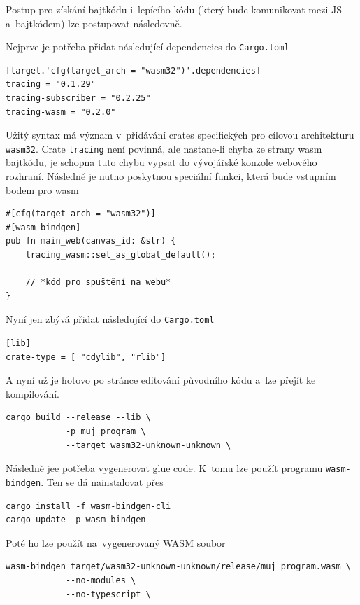 \documentclass[a4paper, 12pt]{article} %
\begin{document}
        Postup pro získání bajtkódu i~lepícího kódu (který bude komunikovat mezi JS a~bajtkódem) lze postupovat následovně.
        
        Nejprve je potřeba přidat následující dependencies do \texttt{Cargo.toml}
        \begin{verbatim}
[target.'cfg(target_arch = "wasm32")'.dependencies]
tracing = "0.1.29"
tracing-subscriber = "0.2.25"
tracing-wasm = "0.2.0"
        \end{verbatim}
        
        Užitý syntax má význam v~přidávání crates specifických pro cílovou architekturu \texttt{wasm32}. Crate \texttt{tracing} není povinná, ale nastane-li chyba ze strany wasm bajtkódu, je schopna tuto chybu vypsat do vývojářské konzole webového rozhraní. Následně je nutno poskytnou speciální funkci, která bude vstupním bodem pro wasm
        \begin{verbatim}
#[cfg(target_arch = "wasm32")]
#[wasm_bindgen]
pub fn main_web(canvas_id: &str) {
    tracing_wasm::set_as_global_default();

    // *kód pro spuštění na webu*
}
        \end{verbatim}
        
        Nyní jen zbývá přidat následující do \texttt{Cargo.toml}
\begin{verbatim}
[lib]
crate-type = [ "cdylib", "rlib"]
        \end{verbatim}
        
        A nyní už je hotovo po stránce editování původního kódu a~lze přejít ke kompilování.
        \begin{verbatim}
cargo build --release --lib \
            -p muj_program \
            --target wasm32-unknown-unknown \
        \end{verbatim}
        
        Následně jee potřeba vygenerovat glue code. K~tomu lze použít programu \texttt{wasm-bindgen}. Ten se dá nainstalovat přes
        \begin{verbatim}
cargo install -f wasm-bindgen-cli
cargo update -p wasm-bindgen
        \end{verbatim}
        
        Poté ho lze použít na~vygenerovaný WASM soubor
        \begin{verbatim}
wasm-bindgen target/wasm32-unknown-unknown/release/muj_program.wasm \
            --no-modules \
            --no-typescript \
        \end{verbatim}
        
\end{document}
